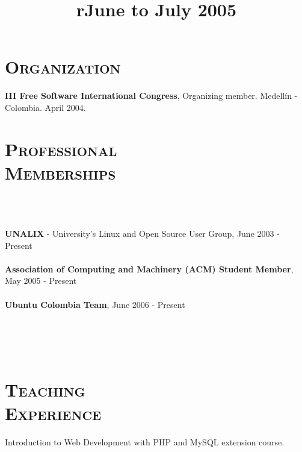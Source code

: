 \begin{resume}
\section{\textsc{Organization}}
\employer{\textbf{}}
\dates{}
\textbf{III Free Software International Congress}, Organizing member. Medell\'{i}n - Colombia. April 2004.
\newline     
\newline
\newline     
\newline
\newline     
\newline          
\newline     
\newline     
\newline     
\newline     

\section{\textsc{Professional\\ Memberships}}

\begin{formatb}
  \\
  \body\\
\end{formatb}
\employer{}
   {\textbf{UNALIX} - University's Linux and Open Source User Group,
     June 2003 - Present \\ \\
    \textbf{Association of Computing and Machinery (ACM) Student
      Member}, May 2005 - Present \\ \\
    \textbf{Ubuntu Colombia Team}, June 2006 - Present 
     }



\begin{formatb}
  \title{r}\\
  \\
 \body\\
\end{formatb}

\section{\textsc{Teaching\\ Experience}}
\title{\textbf{June to July 2005}}
\begin{position}
Introduction to Web Development with PHP and MySQL extension  course.
\end{position}



\end{resume}
